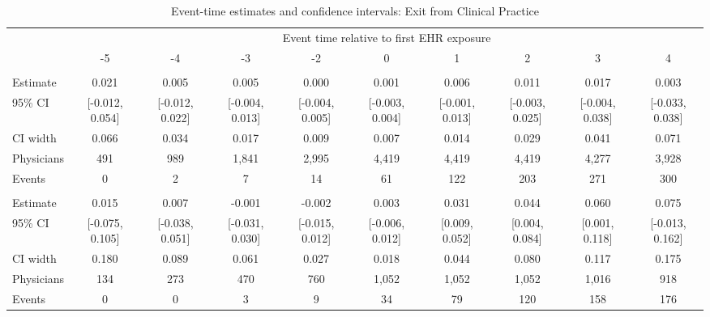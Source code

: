 
\begin{landscape}\begin{table}[!h]
\centering
\caption{\label{tab:ci_retired_ever}Event-time estimates and confidence intervals: Exit from Clinical Practice}
\centering
\fontsize{9}{11}\selectfont
\begin{tabular}[t]{lccccccccc}
\toprule
\multicolumn{1}{c}{ } & \multicolumn{9}{c}{Event time relative to first EHR exposure} \\
\cmidrule(l{3pt}r{3pt}){2-10}
 & -5 & -4 & -3 & -2 & 0 & 1 & 2 & 3 & 4\\
\midrule
\addlinespace[0.3em]
\multicolumn{10}{l}{\textbf{Age $<$ 60}}\\
\hspace{1em}Estimate & 0.021 & 0.005 & 0.005 & 0.000 & 0.001 & 0.006 & 0.011 & 0.017 & 0.003\\
\hspace{1em}95\% CI & {}[-0.012, 0.054] & {}[-0.012, 0.022] & {}[-0.004, 0.013] & {}[-0.004, 0.005] & {}[-0.003, 0.004] & {}[-0.001, 0.013] & {}[-0.003, 0.025] & {}[-0.004, 0.038] & {}[-0.033, 0.038]\\
\hspace{1em}CI width & 0.066 & 0.034 & 0.017 & 0.009 & 0.007 & 0.014 & 0.029 & 0.041 & 0.071\\
\hspace{1em}Physicians & 491 & 989 & 1,841 & 2,995 & 4,419 & 4,419 & 4,419 & 4,277 & 3,928\\
\hspace{1em}Events & 0 & 2 & 7 & 14 & 61 & 122 & 203 & 271 & 300\\
\addlinespace[0.3em]
\multicolumn{10}{l}{\textbf{Age $\geq$ 60}}\\
\hspace{1em}Estimate & 0.015 & 0.007 & -0.001 & -0.002 & 0.003 & 0.031 & 0.044 & 0.060 & 0.075\\
\hspace{1em}95\% CI & {}[-0.075, 0.105] & {}[-0.038, 0.051] & {}[-0.031, 0.030] & {}[-0.015, 0.012] & {}[-0.006, 0.012] & {}[0.009, 0.052] & {}[0.004, 0.084] & {}[0.001, 0.118] & {}[-0.013, 0.162]\\
\hspace{1em}CI width & 0.180 & 0.089 & 0.061 & 0.027 & 0.018 & 0.044 & 0.080 & 0.117 & 0.175\\
\hspace{1em}Physicians & 134 & 273 & 470 & 760 & 1,052 & 1,052 & 1,052 & 1,016 & 918\\
\hspace{1em}Events & 0 & 0 & 3 & 9 & 34 & 79 & 120 & 158 & 176\\

\end{tabular}
\end{table}
\end{landscape}
